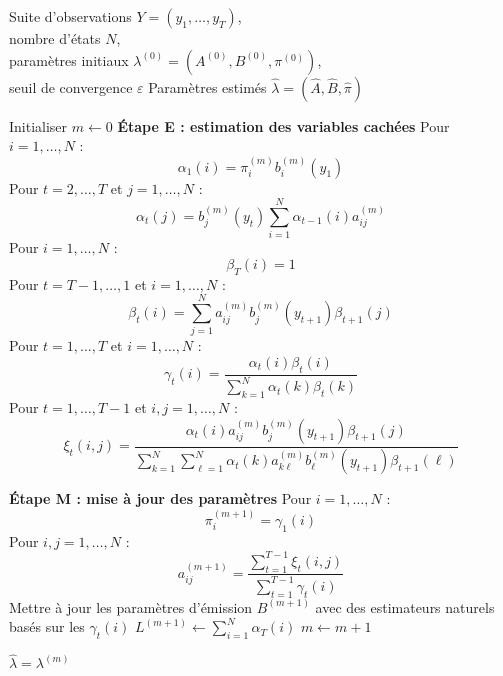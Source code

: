 \documentclass[11pt]{article}
\begin{document}
\vspace{0.5cm}

\begin{algorithm}[H]
\caption{Algorithme de Baum--Welch}
\label{alg:baum-welch-standalone}
\small
\singlespacing
\setlength{\abovedisplayskip}{2pt}
\setlength{\belowdisplayskip}{2pt}
\setlength{\abovedisplayshortskip}{2pt}
\setlength{\belowdisplayshortskip}{2pt}
\begin{algorithmic}[1]
\Require 
Suite d'observations \(Y=(y_1,\dots,y_T)\),\\
nombre d'états \(N\), \\
paramètres initiaux \(\lambda^{(0)}=(A^{(0)},B^{(0)},\pi^{(0)})\),\\
seuil de convergence \(\varepsilon\)
\Ensure Paramètres estimés \(\widehat{\lambda}=(\widehat{A},\widehat{B},\widehat{\pi})\)

\State Initialiser \(m\gets 0\)
\Repeat
    \Statex
    \Statex \textbf{Étape E : estimation des variables cachées}
    \State Pour \(i=1,\dots,N\) :
    \Statex \[
    \alpha_1(i)=\pi_i^{(m)}b_i^{(m)}(y_1)
    \]
    \State Pour \(t=2,\dots,T\) et \(j=1,\dots,N\) :
    \Statex \[
    \alpha_t(j)
    =
    b_j^{(m)}(y_t)
    \sum_{i=1}^{N}\alpha_{t-1}(i)a_{ij}^{(m)}
    \]
    \State Pour \(i=1,\dots,N\) :
    \Statex \[
    \beta_T(i)=1
    \]
    \State Pour \(t=T-1,\dots,1\) et \(i=1,\dots,N\) :
    \Statex \[
    \beta_t(i)
    =
    \sum_{j=1}^{N}
    a_{ij}^{(m)}b_j^{(m)}(y_{t+1})\beta_{t+1}(j)
    \]
    \State Pour \(t=1,\dots,T\) et \(i=1,\dots,N\) :
    \Statex \[
    \gamma_t(i)
    =
    \frac{\alpha_t(i)\beta_t(i)}
    {\sum_{k=1}^{N}\alpha_t(k)\beta_t(k)}
    \]
    \State Pour \(t=1,\dots,T-1\) et \(i,j=1,\dots,N\) :
    \Statex \[
    \xi_t(i,j)
    =
    \frac{
    \alpha_t(i)a_{ij}^{(m)}b_j^{(m)}(y_{t+1})\beta_{t+1}(j)
    }{
    \sum_{k=1}^{N}\sum_{\ell=1}^{N}
    \alpha_t(k)a_{k\ell}^{(m)}b_\ell^{(m)}(y_{t+1})\beta_{t+1}(\ell)
    }
    \]

    \Statex
    \Statex \textbf{Étape M : mise à jour des paramètres}
    \State Pour \(i=1,\dots,N\) :
    \Statex \[
    \pi_i^{(m+1)}=\gamma_1(i)
    \]
    \State Pour \(i,j=1,\dots,N\) :
    \Statex \[
    a_{ij}^{(m+1)}
    =
    \frac{\sum_{t=1}^{T-1}\xi_t(i,j)}
    {\sum_{t=1}^{T-1}\gamma_t(i)}
    \]
    \State Mettre à jour les paramètres d'émission \(B^{(m+1)}\) avec des estimateurs naturels basés sur les \(\gamma_t(i)\)
    \State \(\displaystyle L^{(m+1)}\gets \sum_{i=1}^{N}\alpha_T(i)\)
    \State \(m\gets m+1\)

\State \Return \(\widehat{\lambda}=\lambda^{(m)}\)
\end{algorithmic}
\end{algorithm}
\end{document}
